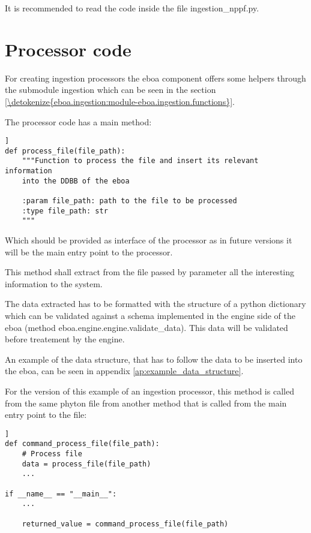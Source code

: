 It is recommended to read the code inside the file ingestion\_nppf.py.

\section{Processor code}

For creating ingestion processors the \acrshort{eboa} component offers some helpers through the submodule ingestion which can be seen in the section \ref{\detokenize{eboa.ingestion:module-eboa.ingestion.functions}}.

The processor code has a main method:

\begin{lstlisting}[breaklines=true, style=python]]
def process_file(file_path):
    """Function to process the file and insert its relevant information
    into the DDBB of the eboa

    :param file_path: path to the file to be processed
    :type file_path: str
    """
\end{lstlisting}

Which should be provided as interface of the processor as in future versions it will be the main entry point to the processor.

This method shall extract from the file passed by parameter all the interesting information to the system.

The data extracted has to be formatted with the structure of a python dictionary which can be validated against a schema implemented in the engine side of the \acrshort{eboa} (method eboa.engine.engine.validate\_data). This data will be validated before treatement by the engine.

An example of the data structure, that has to follow the data to be inserted into the \acrshort{eboa}, can be seen in appendix \ref{ap:example_data_structure}.

For the version of this example of an ingestion processor, this method is called from the same phyton file from another method that is called from the main entry point to the file:

\begin{lstlisting}[breaklines=true, style=python]]
def command_process_file(file_path):
    # Process file
    data = process_file(file_path)
    ...

if __name__ == "__main__":
    ...

    returned_value = command_process_file(file_path)
\end{lstlisting}

